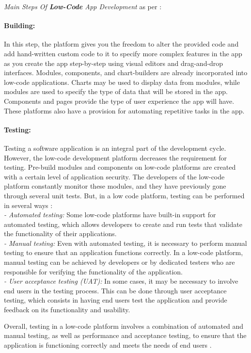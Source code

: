 \textit{Main Steps Of \textbf{Low-Code} App Development} as per \cite{misc:lowcode:steps}:
\paragraph*{Building:}
In this step, the platform gives you the freedom to alter the provided code and add hand-written custom code to it to specify more complex features in the app as you create the app step-by-step using visual editors and drag-and-drop interfaces.
Modules, components, and chart-builders are already incorporated into low-code applications. 
Charts may be used to display data from modules, while modules are used to specify the type of data that will be stored in the app. 
Components and pages provide the type of user experience the app will have.
These platforms also have a provision for automating repetitive tasks in the app.
\paragraph*{Testing:}
Testing a software application is an integral part of the development cycle.
However, the low-code development platform decreases the requirement for testing. 
Pre-build modules and components on low-code platforms are created with a certain level of application security. 
The developers of the low-code platform constantly monitor these modules, and they have previously gone through several unit tests.
But, in a low code platform, testing can be performed in several ways \cite{misc:lowcode:testing}: \\
\textit{- Automated testing:} Some low-code platforms have built-in support for automated testing, which allows developers to create and run tests that validate the functionality of their applications.\\
\textit{- Manual testing:} Even with automated testing, it is necessary to perform manual testing to ensure that an application functions correctly. In a low-code platform, manual testing can be achieved by developers or by dedicated testers who are responsible for verifying the functionality of the application.\\
\textit{- User acceptance testing (UAT):} In some cases, it may be necessary to involve end users in the testing process. This can be done through user acceptance testing, which consists in having end users test the application and provide feedback on its functionality and usability.

Overall, testing in a low-code platform involves a combination of automated and manual testing, as well as performance and acceptance testing, to ensure that the application is functioning correctly and meets the needs of end users \cite{misc:lowcode:testing}.
